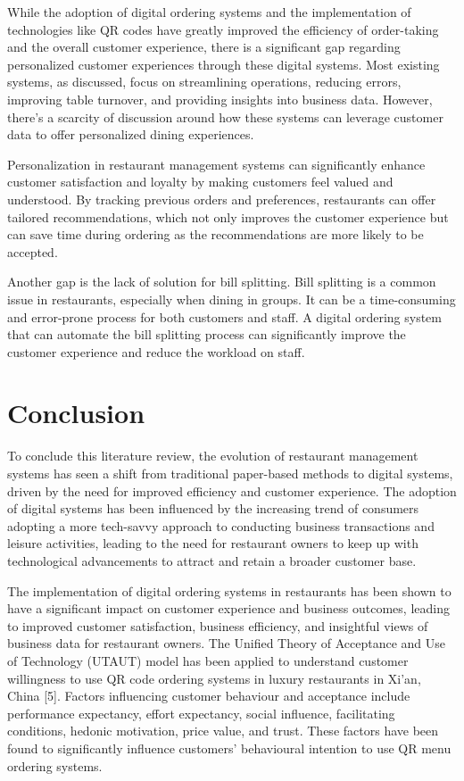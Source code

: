 While the adoption of digital ordering systems and the implementation of technologies like QR codes have greatly improved the efficiency of order-taking and the overall customer experience, there is a significant gap regarding personalized customer experiences through these digital systems. Most existing systems, as discussed, focus on streamlining operations, reducing errors, improving table turnover, and providing insights into business data. However, there's a scarcity of discussion around how these systems can leverage customer data to offer personalized dining experiences.

Personalization in restaurant management systems can significantly enhance customer satisfaction and loyalty by making customers feel valued and understood. By tracking previous orders and preferences, restaurants can offer tailored recommendations, which not only improves the customer experience but can save time during ordering as the recommendations are more likely to be accepted.

Another gap is the lack of solution for bill splitting. Bill splitting is a common issue in restaurants, especially when dining in groups. It can be a time-consuming and error-prone process for both customers and staff. A digital ordering system that can automate the bill splitting process can significantly improve the customer experience and reduce the workload on staff.

\section{Conclusion}
To conclude this literature review, the evolution of restaurant management systems has seen a shift from traditional paper-based methods to digital systems, driven by the need for improved efficiency and customer experience. The adoption of digital systems has been influenced by the increasing trend of consumers adopting a more tech-savvy approach to conducting business transactions and leisure activities, leading to the need for restaurant owners to keep up with technological advancements to attract and retain a broader customer base. 

The implementation of digital ordering systems in restaurants has been shown to have a significant impact on customer experience and business outcomes, leading to improved customer satisfaction, business efficiency, and insightful views of business data for restaurant owners. The Unified Theory of Acceptance and Use of Technology (UTAUT) model has been applied to understand customer willingness to use QR code ordering systems in luxury restaurants in Xi'an, China [5]. Factors influencing customer behaviour and acceptance include performance expectancy, effort expectancy, social influence, facilitating conditions, hedonic motivation, price value, and trust. These factors have been found to significantly influence customers' behavioural intention to use QR menu ordering systems.

